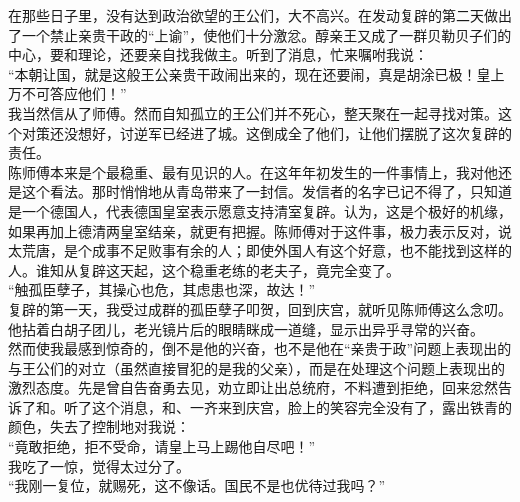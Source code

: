 在那些日子里，没有达到政治欲望的王公们，大不高兴。在发动复辟的第二天做出了一个禁止亲贵干政的“上谕”，使他们十分激忿。醇亲王又成了一群贝勒贝子们的中心，要和理论，还要亲自找我做主。听到了消息，忙来嘱咐我说：\\

“本朝让国，就是这般王公亲贵干政闹出来的，现在还要闹，真是胡涂已极！皇上万不可答应他们！”\\

我当然信从了师傅。然而自知孤立的王公们并不死心，整天聚在一起寻找对策。这个对策还没想好，讨逆军已经进了城。这倒成全了他们，让他们摆脱了这次复辟的责任。\\

陈师傅本来是个最稳重、最有见识的人。在这年年初发生的一件事情上，我对他还是这个看法。那时悄悄地从青岛带来了一封信。发信者的名字已记不得了，只知道是一个德国人，代表德国皇室表示愿意支持清室复辟。认为，这是个极好的机缘，如果再加上德清两皇室结亲，就更有把握。陈师傅对于这件事，极力表示反对，说太荒唐，是个成事不足败事有余的人；即使外国人有这个好意，也不能找到这样的人。谁知从复辟这天起，这个稳重老练的老夫子，竟完全变了。\\

“触孤臣孽子，其操心也危，其虑患也深，故达！”\\

复辟的第一天，我受过成群的孤臣孽子叩贺，回到庆宫，就听见陈师傅这么念叨。他拈着白胡子团儿，老光镜片后的眼睛眯成一道缝，显示出异乎寻常的兴奋。\\

然而使我最感到惊奇的，倒不是他的兴奋，也不是他在“亲贵于政”问题上表现出的与王公们的对立（虽然直接冒犯的是我的父亲），而是在处理这个问题上表现出的激烈态度。先是曾自告奋勇去见，劝立即让出总统府，不料遭到拒绝，回来忿然告诉了和。听了这个消息，和、一齐来到庆宫，脸上的笑容完全没有了，露出铁青的颜色，失去了控制地对我说：\\

“竟敢拒绝，拒不受命，请皇上马上踢他自尽吧！”\\

我吃了一惊，觉得太过分了。\\

“我刚一复位，就赐死，这不像话。国民不是也优待过我吗？”\\

